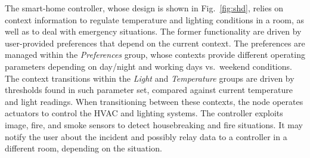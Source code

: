 The smart-home controller, whose design is shown in
Fig.~\ref{fig:shd}, relies on context information to regulate
temperature and lighting conditions in a room, as well as to deal with
emergency situations. The former functionality are driven by
user-provided preferences that depend on the current context. The
preferences are managed within the \emph{Preferences} group, whose
contexts provide different operating parameters depending on day/night
and working days vs.\ weekend conditions. The context transitions
within the \emph{Light} and \emph{Temperature} groups are driven by
thresholds found in such parameter set, compared against current
temperature and light readings. When transitioning between these
contexts, the node operates actuators to control the HVAC and lighting
systems. The controller exploits image, fire, and smoke sensors to
detect housebreaking and fire situations. It may notify the user about
the incident and possibly relay data to a controller in a different
room, depending on the situation.




